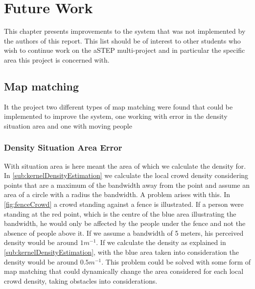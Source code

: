 \chapter{Future Work}\label{ch:future_work}

This chapter presents improvements to the system that was not implemented by the authors of this report. This list should be of interest to other students who wish to continue work on the aSTEP multi-project and in particular the specific area this project is concerned with.

\section{Map matching}
It the project two different types of map matching were found that could be implemented to improve the system, one working with error in the density situation area and one with moving people
\subsection{Density Situation Area Error}
With situation area is here meant the area of which we calculate the density for. In \cref{sub:kernelDensityEstimation}
we calculate the local crowd density considering points that are a maximum of the bandwidth away from the point and assume an area of a circle with a radius the bandwidth. A problem arises with this. In \cref{fig:fenceCrowd} a crowd standing against a fence is illustrated. If a person were standing at the red point, which is the centre of the blue area illustrating the bandwidth, he would only be affected by the people under the fence and not the absence of people above it. If we assume a bandwidth of 5 meters, his perceived density would be around $1 m^{-1}$. If we calculate the density as explained in \cref{sub:kernelDensityEstimation}, with the blue area taken into consideration the density would be around $0.5 m^{-1}$.
This problem could be solved with some form of map matching that could dynamically change the area considered for each local crowd density, taking obstacles into considerations.

